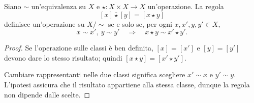 \begin{proposizione}
Siano $\sim$ un'equivalenza su $X$ e $\star:X\times X\to X$ un'operazione. La regola
\[
[x]\mathbin{\overline\star}[y]=[x\star y]
\]
definisce un'operazione su $X/{\sim}$ se e solo se, per ogni $x,x',y,y'\in X$,
\[
x\sim x',\ y\sim y'\quad\Longrightarrow\quad x\star y\sim x'\star y'.
\]
\end{proposizione}
\begin{proof}
\passomath{\Rightarrow} Se l'operazione sulle classi è ben definita, $[x]=[x']$ e $[y]=[y']$ devono dare lo stesso risultato; quindi $[x\star y]=[x'\star y']$.

\passomath{\Leftarrow} Cambiare rappresentanti nelle due classi significa scegliere $x'\sim x$ e $y'\sim y$. L'ipotesi assicura che il risultato appartiene alla stessa classe, dunque la regola non dipende dalle scelte.
\end{proof}
